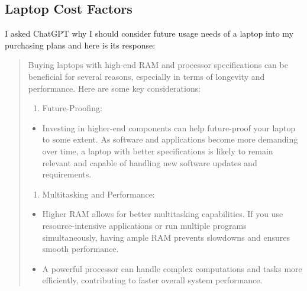 \documentclass[14pt, letterpaper,twoside]{extreport}
\begin{document}

\hypertarget{notes-on-future-proofing-laptops}{%
\subsection*{Laptop Cost Factors}\label{notes-on-future-proofing-laptops}}

I asked ChatGPT why I should consider future usage needs of a laptop into my purchasing plans and here is its response:

\begin{quote}
Buying laptops with high-end RAM and processor specifications can be beneficial for several reasons, especially in terms of longevity and performance. Here are some key considerations:

\begin{enumerate}
\def\labelenumi{\arabic{enumi}.}

\item
 Future-Proofing:
\end{enumerate}

\begin{itemize}

\item
 Investing in higher-end components can help future-proof your laptop to some extent. As software and applications become more demanding over time, a laptop with better specifications is likely to remain relevant and capable of handling new software updates and requirements.
\end{itemize}

\begin{enumerate}
\def\labelenumi{\arabic{enumi}.}
\setcounter{enumi}{1}

\item
 Multitasking and Performance:
\end{enumerate}

\begin{itemize}

\item
 Higher RAM allows for better multitasking capabilities. If you use resource-intensive applications or run multiple programs simultaneously, having ample RAM prevents slowdowns and ensures smooth performance.
\item
 A powerful processor can handle complex computations and tasks more efficiently, contributing to faster overall system performance.
\end{itemize}


\end{quote}
\end{document}
